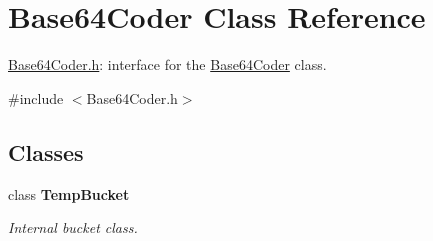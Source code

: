 \hypertarget{class_base64_coder}{\section{\-Base64\-Coder \-Class \-Reference}
\label{class_base64_coder}
}


\hyperlink{_base64_coder_8h}{\-Base64\-Coder.\-h}\-: interface for the \hyperlink{class_base64_coder}{\-Base64\-Coder} class.  




{\ttfamily \#include $<$\-Base64\-Coder.\-h$>$}

\subsection*{\-Classes}
\begin{DoxyCompactItemize}
\item 
class {\bfseries \-Temp\-Bucket}
\begin{DoxyCompactList}\small\item\em \-Internal bucket class. \end{DoxyCompactList}\end{DoxyCompactItemize}
